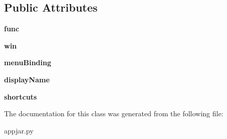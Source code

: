 \subsection*{Public Attributes}
\begin{DoxyCompactItemize}
\item 
\mbox{\label{class_python_01_g_u_i_1_1appjar_1_1_event_binding_a51247fea6a4702a843f20055f3ec99b0}} 
{\bfseries func}
\item 
\mbox{\label{class_python_01_g_u_i_1_1appjar_1_1_event_binding_a0ff783cdc8bb35fe1a51473aea533167}} 
{\bfseries win}
\item 
\mbox{\label{class_python_01_g_u_i_1_1appjar_1_1_event_binding_a3eca2e881cfa9b94c70ff5eefb38c567}} 
{\bfseries menu\+Binding}
\item 
\mbox{\label{class_python_01_g_u_i_1_1appjar_1_1_event_binding_ac52620ae84bebcc07ce1c8b7a61a775f}} 
{\bfseries display\+Name}
\item 
\mbox{\label{class_python_01_g_u_i_1_1appjar_1_1_event_binding_a001f4d73d3aace50fbcb2d3a626ac15d}} 
{\bfseries shortcuts}
\end{DoxyCompactItemize}


The documentation for this class was generated from the following file\+:\begin{DoxyCompactItemize}
\item 
appjar.\+py\end{DoxyCompactItemize}
